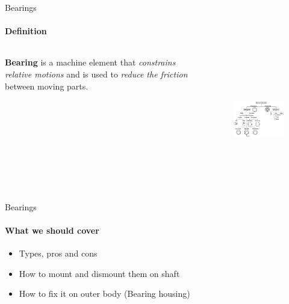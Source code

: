 \documentclass[aspectratio=169]{beamer}
\begin{document}
\begin{frame}[t]{Bearings}
\framesubtitle{Definition}
\vspace{-0.5cm}
    \begin{columns}[T,onlytextwidth]
        \begin{column}{0.39\textwidth}
            \textbf{Bearing} is a machine element that \textit{constrains relative motions} and is used to \textit{reduce the friction} between moving parts.
        \end{column}
        \begin{column}{0.59\textwidth}
            \begin{figure}[H]
                \centering\includegraphics[height=5.5cm,width=1\textwidth,keepaspectratio]{bearing_conf.png}
                \label{fig:bearing_conf.png}
            \end{figure}
        \end{column}
    \end{columns}
\end{frame}

\begin{frame}[t]{Bearings}
\framesubtitle{What we should cover}
    \begin{itemize}
        \item Types, pros and cons
        \item How to mount and dismount them on shaft
        \item How to fix it on outer body (Bearing housing)
    \end{itemize}
\end{frame}
\end{document}
